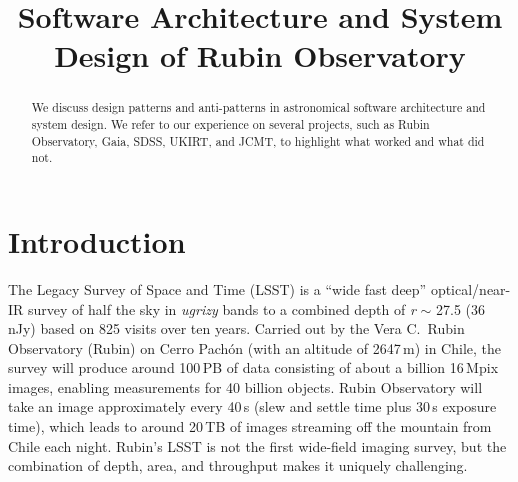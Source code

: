 \documentclass[11pt,twoside]{article}
\begin{document}

\title{Software Architecture and System Design of Rubin Observatory}







\begin{abstract}
We discuss design patterns and anti-patterns in astronomical software architecture and system design. We refer to our experience on several projects, such as Rubin Observatory, Gaia, SDSS, UKIRT, and JCMT, to highlight what worked and what did not.
\end{abstract}

\section{Introduction}

The Legacy Survey of Space and Time (LSST) \citep{2019ApJ...873..111I} is a ``wide fast deep'' optical/near-IR survey of half the sky in \emph{ugrizy} bands to a combined depth of \emph{r} $\sim$ 27.5 (36\,nJy) based on 825 visits over ten years.
Carried out by the Vera C.\ Rubin Observatory (Rubin) on Cerro Pach\'{o}n (with an altitude of 2647\,m) in Chile, the survey will produce around 100\,PB of data consisting of about a billion 16\,Mpix images, enabling measurements for 40 billion objects.
Rubin Observatory will take an image approximately every 40\,s (slew and settle time plus 30\,s exposure time), which leads to around 20\,TB of images streaming off the mountain from Chile each night.
Rubin's LSST is not the first wide-field imaging survey, but the combination of depth, area, and throughput makes it uniquely challenging.
\end{document}
